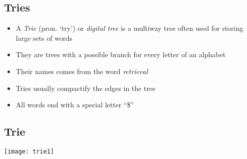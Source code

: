 \Outline %

\begin{slide}
\section[-1]{Tries}

\begin{PauseHighLight}
  \begin{itemize}
  \item A \emph{Trie} (pron. `try') or \emph{digital tree} is a multiway
    tree often used for storing large sets of words\pause
  \item They are trees with a possible branch for every letter of an
    alphabet\pause
  \item Their names comes from the word \textit{re\emph{trie}val}\pause
  \item Tries usually compactify the edges in the tree\pause
  \item All words end with a special letter ``\$''\pause
  \end{itemize}
\end{PauseHighLight}

\end{slide}



\begin{slide}
\section[-1]{Trie}
\pause
\pb
\begin{center}
  \texttt{[image: trie1]}
\end{center}

\end{slide}


